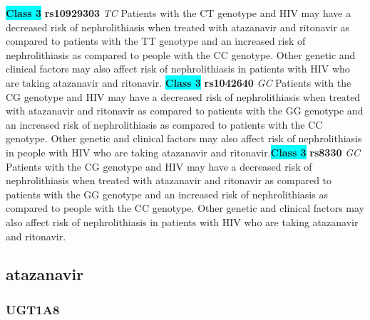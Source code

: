 \documentclass{book}
\begin{document}
\begin{center}
\textbf{\colorbox{cyan} {Class 3}} \textbf{ rs10929303 } \textit{ TC }
Patients with the CT genotype and HIV may have a decreased risk of nephrolithiasis when treated with atazanavir and ritonavir as compared to patients with the TT genotype and an increased risk of nephrolithiasis as compared to people with the CC genotype. Other genetic and clinical factors may also affect risk of nephrolithiasis in patients with HIV who are taking atazanavir and ritonavir. \textbf{\colorbox{cyan} {Class 3}} \textbf{ rs1042640 } \textit{ GC }
Patients with the CG genotype and HIV may have a decreased risk of nephrolithiasis when treated with atazanavir and ritonavir as compared to patients with the GG genotype and an increased risk of nephrolithiasis as compared to patients with the CC genotype. Other genetic and clinical factors may also affect risk of nephrolithiasis in people with HIV who are taking atazanavir and ritonavir.\textbf{\colorbox{cyan} {Class 3}} \textbf{ rs8330 } \textit{ GC }
Patients with the CG genotype and HIV may have a decreased risk of nephrolithiasis when treated with atazanavir and ritonavir as compared to patients with the GG genotype and an increased risk of nephrolithiasis as compared to people with the CC genotype. Other genetic and clinical factors may also affect risk of nephrolithiasis in patients with HIV who are taking atazanavir and ritonavir.


\end{center}\subsection{ atazanavir }


\subsubsection{ UGT1A8 }
\end{document}
